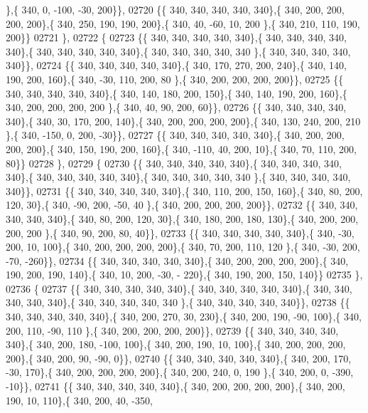 \begin{DoxyCode}
      \},\{ 340,   0, -100, -30, 200\}\},
02720 \{\{ 340, 340, 340, 340, 340\},\{ 340, 200, 200, 200, 200\},\{ 340, 250, 190, 190, 200\},\{ 340,  40, -60,  10, 200
      \},\{ 340, 210, 110, 190, 200\}\}
02721 \},
02722 \{
02723 \{\{ 340, 340, 340, 340, 340\},\{ 340, 340, 340, 340, 340\},\{ 340, 340, 340, 340, 340\},\{ 340, 340, 340, 340, 340
      \},\{ 340, 340, 340, 340, 340\}\},
02724 \{\{ 340, 340, 340, 340, 340\},\{ 340, 170, 270, 200, 240\},\{ 340, 140, 190, 200, 160\},\{ 340, -30, 110, 200,  80
      \},\{ 340, 200, 200, 200, 200\}\},
02725 \{\{ 340, 340, 340, 340, 340\},\{ 340, 140, 180, 200, 150\},\{ 340, 140, 190, 200, 160\},\{ 340, 200, 200, 200, 200
      \},\{ 340,  40,  90, 200,  60\}\},
02726 \{\{ 340, 340, 340, 340, 340\},\{ 340,  30, 170, 200, 140\},\{ 340, 200, 200, 200, 200\},\{ 340, 130, 240, 200, 210
      \},\{ 340, -150,   0, 200, -30\}\},
02727 \{\{ 340, 340, 340, 340, 340\},\{ 340, 200, 200, 200, 200\},\{ 340, 150, 190, 200, 160\},\{ 340, -110,  40, 200,  
      10\},\{ 340,  70, 110, 200,  80\}\}
02728 \},
02729 \{
02730 \{\{ 340, 340, 340, 340, 340\},\{ 340, 340, 340, 340, 340\},\{ 340, 340, 340, 340, 340\},\{ 340, 340, 340, 340, 340
      \},\{ 340, 340, 340, 340, 340\}\},
02731 \{\{ 340, 340, 340, 340, 340\},\{ 340, 110, 200, 150, 160\},\{ 340,  80, 200, 120,  30\},\{ 340, -90, 200, -50,  40
      \},\{ 340, 200, 200, 200, 200\}\},
02732 \{\{ 340, 340, 340, 340, 340\},\{ 340,  80, 200, 120,  30\},\{ 340, 180, 200, 180, 130\},\{ 340, 200, 200, 200, 200
      \},\{ 340,  90, 200,  80,  40\}\},
02733 \{\{ 340, 340, 340, 340, 340\},\{ 340, -30, 200,  10, 100\},\{ 340, 200, 200, 200, 200\},\{ 340,  70, 200, 110, 120
      \},\{ 340, -30, 200, -70, -260\}\},
02734 \{\{ 340, 340, 340, 340, 340\},\{ 340, 200, 200, 200, 200\},\{ 340, 190, 200, 190, 140\},\{ 340,  10, 200, -30, -
      220\},\{ 340, 190, 200, 150, 140\}\}
02735 \},
02736 \{
02737 \{\{ 340, 340, 340, 340, 340\},\{ 340, 340, 340, 340, 340\},\{ 340, 340, 340, 340, 340\},\{ 340, 340, 340, 340, 340
      \},\{ 340, 340, 340, 340, 340\}\},
02738 \{\{ 340, 340, 340, 340, 340\},\{ 340, 200, 270,  30, 230\},\{ 340, 200, 190, -90, 100\},\{ 340, 200, 110, -90, 110
      \},\{ 340, 200, 200, 200, 200\}\},
02739 \{\{ 340, 340, 340, 340, 340\},\{ 340, 200, 180, -100, 100\},\{ 340, 200, 190,  10, 100\},\{ 340, 200, 200, 200, 
      200\},\{ 340, 200,  90, -90,   0\}\},
02740 \{\{ 340, 340, 340, 340, 340\},\{ 340, 200, 170, -30, 170\},\{ 340, 200, 200, 200, 200\},\{ 340, 200, 240,   0, 190
      \},\{ 340, 200,   0, -390, -10\}\},
02741 \{\{ 340, 340, 340, 340, 340\},\{ 340, 200, 200, 200, 200\},\{ 340, 200, 190,  10, 110\},\{ 340, 200,  40, -350,  

\end{DoxyCode}
